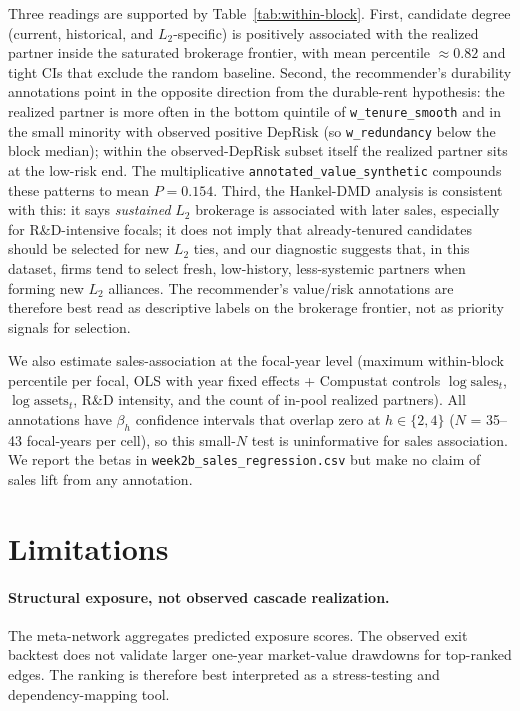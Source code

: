 \documentclass[11pt,letterpaper]{article}
\begin{document}
Three readings are supported by Table~\ref{tab:within-block}.  First,
candidate degree (current, historical, and $L_2$-specific) is
positively associated with the realized partner inside the saturated
brokerage frontier, with mean percentile $\approx 0.82$ and tight
CIs that exclude the random baseline.  Second, the recommender's
durability annotations point in the opposite direction from the
durable-rent hypothesis: the realized partner is more often in the
bottom quintile of \texttt{w\_tenure\_smooth} and in the small
minority with observed positive $\text{DepRisk}$ (so
\texttt{w\_redundancy} below the block median); within the
observed-$\text{DepRisk}$ subset itself the realized partner sits
at the low-risk end.  The multiplicative
\texttt{annotated\_value\_synthetic} compounds these patterns to
mean $P = 0.154$.  Third, the Hankel-DMD analysis is consistent
with this: it says \emph{sustained} $L_2$ brokerage is associated
with later sales, especially for R\&D-intensive focals; it does
not imply that already-tenured candidates should be selected for
new $L_2$ ties, and our diagnostic suggests that, in this dataset,
firms tend to select fresh, low-history, less-systemic partners
when forming new $L_2$ alliances.  The recommender's value/risk
annotations are therefore best read as descriptive labels on the
brokerage frontier, not as priority signals for selection.

We also estimate sales-association at the focal-year level
(maximum within-block percentile per focal, OLS with year fixed
effects + Compustat controls $\log\text{sales}_t$,
$\log\text{assets}_t$, R\&D intensity, and the count of in-pool
realized partners).  All annotations have $\beta_h$ confidence
intervals that overlap zero at $h \in \{2, 4\}$ ($N$ = 35--43
focal-years per cell), so this small-$N$ test is uninformative for
sales association.  We report the betas in
\texttt{week2b\_sales\_regression.csv} but make no claim of sales
lift from any annotation.

\section{Limitations}
\label{sec:limitations}

\paragraph{Structural exposure, not observed cascade realization.}
The meta-network aggregates predicted exposure scores.  The observed
exit backtest does not validate larger one-year market-value drawdowns
for top-ranked edges.  The ranking is therefore best interpreted as a
stress-testing and dependency-mapping tool.
\end{document}
